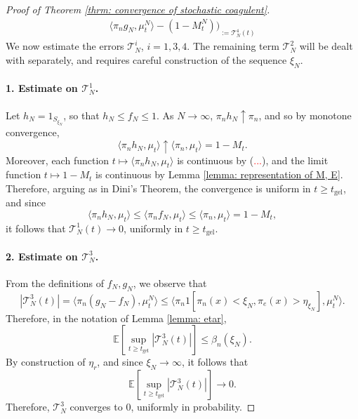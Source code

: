 \begin{proof}[Proof of Theorem \ref{thrm: convergence of stochastic coagulent}]
\begin{equation}
\begin{split}
{   \langle \pi_n g_N, \mu^N_t\rangle - (1-M^N_t))}_{:=\mathcal{T}^4_N(t)}\end{split} \end{equation} We now estimate the errors $\mathcal{T}^i_N$, $i=1,3,4.$ The remaining term $\mathcal{T}^2_N$ will be dealt with separately, and requires careful construction of the sequence $\xi_N$. \paragraph{1. Estimate on $\mathcal{T}^1_N$.} Let $h_N=1_{S_{\xi_N}}$, so that $h_N \le f_N \le 1$. As $N\rightarrow \infty$, $\pi_n h_N \uparrow \pi_n$, and so by monotone convergence, \begin{equation}
       \langle \pi_n h_N, \mu_t\rangle \uparrow \langle \pi_n, \mu_t\rangle =1-M_t.
   \end{equation} Moreover, each function $t\mapsto \langle \pi_n h_N, \mu_t\rangle$ is continuous by (\textcolor{red}{...}), and the limit function $t\mapsto 1-M_t$ is continuous by Lemma \ref{lemma: representation of M, E}. Therefore, arguing as in Dini's Theorem, the convergence is uniform in $t\geq t_\text{gel}$, and since \begin{equation}
       \langle \pi_n h_N, \mu_t\rangle \le \langle \pi_n f_N, \mu_t \rangle \le \langle \pi_n, \mu_t\rangle = 1-M_t, 
   \end{equation} it follows that $\mathcal{T}^1_N(t) \rightarrow 0$, uniformly in $t\geq t_\text{gel}$.
   \paragraph{2. Estimate on $\mathcal{T}^3_N$.} From the definitions of $f_N, g_N$, we observe that \begin{equation}
       |\mathcal{T}^3_N(t)|=\langle \pi_n(g_N-f_N), \mu^N_t\rangle \le  \langle \pi_n 1[\pi_n(x)<\xi_N, \pi_e(x)>\eta_{\xi_N}], \mu^N_t\rangle.
   \end{equation} Therefore, in the notation of Lemma \ref{lemma: etar}, \begin{equation}
       \mathbb{E}\left[\sup_{t\geq t_\text{gel}} |\mathcal{T}^3_N(t)|\right] \leq \beta_n(\xi_N).
   \end{equation} By construction of $\eta_r$, and since $\xi_N \rightarrow \infty$, it follows that \begin{equation}
       \mathbb{E}\left[\sup_{t\geq t_\text{gel}} |\mathcal{T}^3_N(t)|\right] \rightarrow 0.\end{equation} Therefore, $\mathcal{T}^3_N$ converges to $0$, uniformly in probability.

\end{proof}

